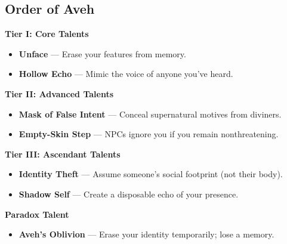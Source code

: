 \documentclass[11pt]{book}
\begin{document}
\subsection*{Order of Aveh}
\begin{tcolorbox}[colback=mistgray!10,colframe=bloodrust,title={Order of Aveh --- Talents}]

\textbf{Tier I: Core Talents}
\begin{itemize}[noitemsep]
  \item \textbf{Unface} --- Erase your features from memory.
  \item \textbf{Hollow Echo} --- Mimic the voice of anyone you've heard.
\end{itemize}

\textbf{Tier II: Advanced Talents}
\begin{itemize}[noitemsep]
  \item \textbf{Mask of False Intent} --- Conceal supernatural motives from diviners.
  \item \textbf{Empty-Skin Step} --- NPCs ignore you if you remain nonthreatening.
\end{itemize}

\textbf{Tier III: Ascendant Talents}
\begin{itemize}[noitemsep]
  \item \textbf{Identity Theft} --- Assume someone's social footprint (not their body).
  \item \textbf{Shadow Self} --- Create a disposable echo of your presence.
\end{itemize}

\textbf{Paradox Talent}
\begin{itemize}[noitemsep]
  \item \textbf{Aveh's Oblivion} --- Erase your identity temporarily; lose a memory.
\end{itemize}

\end{tcolorbox}

\end{document}
